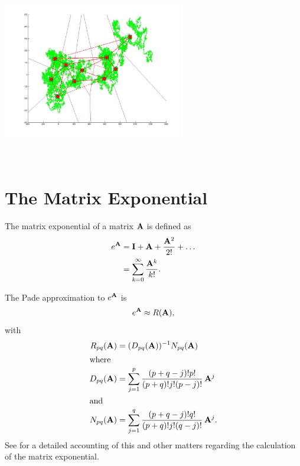 \includegraphics[width=8.0cm,height=8.0cm]{Figures/ClusteringRW/rw_1000000_delauney_kmens_convex_hull_voroni_onKM.jpg}


\section{The Matrix Exponential}
The matrix exponential of a matrix $\mathbf{A}$ is defined as
\begin{align*}
  e^{\mathbf{A}}
  &= \mathbf{I} + \mathbf{A} + \frac{\mathbf{A}^2}{2!} + \dots \\
  &= \sum_{k = 0}^\infty \frac{\mathbf{A}^k}{k!}.
\end{align*}

The Pade approximation to
$e^{\mathbf{A}}$ is
\begin{displaymath}
  e^{\mathbf{A}} \approx R(\mathbf{A}),
\end{displaymath}
with
\begin{align*}
  R_{pq} (\mathbf{A})
  &= (D_{pq}(\mathbf{A}))^{-1} N_{pq}(\mathbf{A}) \\
  \intertext{where}
  D_{pq}(\mathbf{A})
  &= \sum_{j=1}^p \frac{(p+q-j)! p!}{ (p+q)!j!(p-j)!}\, \mathbf{A}^j \\
  \intertext{and}
  N_{pq}(\mathbf{A})
  &= \sum_{j=1}^q \frac{(p+q-j)! q!}{ (p+q)!j!(q-j)!}\, \mathbf{A}^j.
\end{align*}
See \cite{Moler78nineteendubious} for a detailed accounting of this and other matters regarding the calculation of the matrix exponential.
